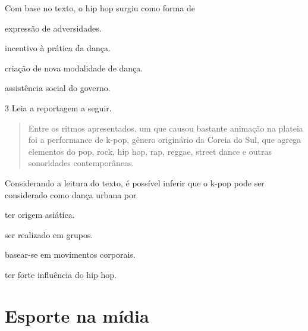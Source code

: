 Com base no texto, o hip hop surgiu como forma de

\begin{escolha}
\item expressão de adversidades.

\item incentivo à prática da dança.

\item criação de nova modalidade de dança.

\item assistência social do governo.
\end{escolha}



\num{3}  Leia a reportagem a seguir.

\begin{quote}
Entre os ritmos apresentados, um que causou bastante animação na plateia
foi a performance de k-pop, gênero originário da Coreia do Sul, que
agrega elementos do pop, rock, hip hop, rap, reggae, street dance e
outras sonoridades contemporâneas.

\end{quote}

Considerando a leitura do texto, é possível inferir que o k-pop pode ser
considerado como dança urbana por

\begin{escolha}
\item ter origem asiática.

\item ser realizado em grupos.

\item basear-se em movimentos corporais.

\item ter forte influência do hip hop.
\end{escolha}


\chapter{Esporte na mídia}


